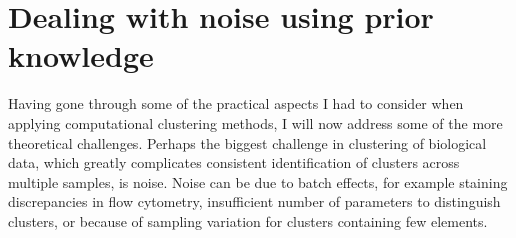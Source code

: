 
\section{Dealing with noise using prior knowledge}

Having gone through some of the practical aspects I had to consider when applying computational clustering methods, I will now address some of the more theoretical challenges.
Perhaps the biggest challenge in clustering of biological data, which greatly complicates consistent identification of clusters across multiple samples, is noise.
Noise can be due to batch effects, for example staining discrepancies in flow cytometry, insufficient number of parameters to distinguish clusters, or because of sampling variation for clusters containing few elements.

